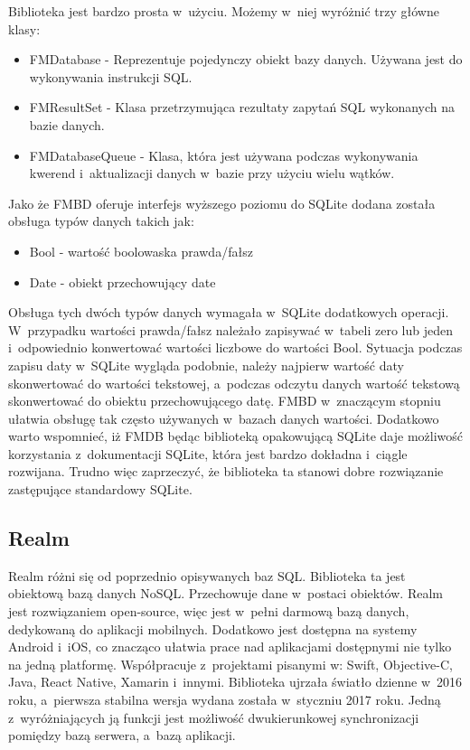 Biblioteka jest bardzo prosta w~użyciu. Możemy w~niej wyróżnić trzy główne klasy: 

\begin{itemize}
	\item  FMDatabase - Reprezentuje pojedynczy obiekt bazy danych. Używana jest do wykonywania instrukcji SQL. 
	\item FMResultSet - Klasa przetrzymująca rezultaty zapytań SQL wykonanych na bazie danych.
	\item FMDatabaseQueue - Klasa, która jest używana podczas wykonywania kwerend i~aktualizacji danych w~bazie przy użyciu wielu wątków.
\end{itemize}

Jako że FMBD oferuje interfejs wyższego poziomu do SQLite dodana została obsługa typów danych takich jak: 

\begin{itemize}
	\item Bool -  wartość boolowaska prawda/fałsz 
	\item Date - obiekt przechowujący date
\end{itemize}

Obsługa tych dwóch typów danych wymagała w~SQLite dodatkowych operacji. W~przypadku wartości prawda/fałsz należało zapisywać w~tabeli zero lub jeden i~odpowiednio konwertować wartości liczbowe do wartości Bool. Sytuacja podczas zapisu daty w~SQLite wygląda podobnie, należy najpierw wartość daty skonwertować do wartości tekstowej, a~podczas odczytu danych wartość tekstową skonwertować do obiektu przechowującego datę. FMBD w~znaczącym stopniu ułatwia obsługę tak często używanych w~bazach danych wartości. Dodatkowo warto wspomnieć, iż FMDB będąc biblioteką opakowującą SQLite daje możliwość korzystania z~dokumentacji SQLite, która jest bardzo dokładna i~ciągle rozwijana. Trudno więc zaprzeczyć, że biblioteka ta stanowi dobre rozwiązanie zastępujące standardowy SQLite. 

\subsection{Realm}

Realm różni się od poprzednio opisywanych baz SQL. Biblioteka ta jest obiektową bazą danych NoSQL. Przechowuje dane w~postaci obiektów. Realm jest rozwiązaniem open-source, więc jest w~pełni darmową bazą danych, dedykowaną do aplikacji mobilnych. Dodatkowo jest dostępna na systemy Android i~iOS, co znacząco ułatwia prace nad aplikacjami dostępnymi nie tylko na jedną platformę. Współpracuje z~projektami pisanymi w: Swift, Objective-C, Java, React Native, Xamarin i~innymi. Biblioteka ujrzała światło dzienne w~2016 roku, a~pierwsza stabilna wersja wydana została w~styczniu 2017 roku. Jedną z~wyróżniających ją funkcji jest możliwość dwukierunkowej synchronizacji pomiędzy bazą serwera, a~bazą aplikacji.\par 

